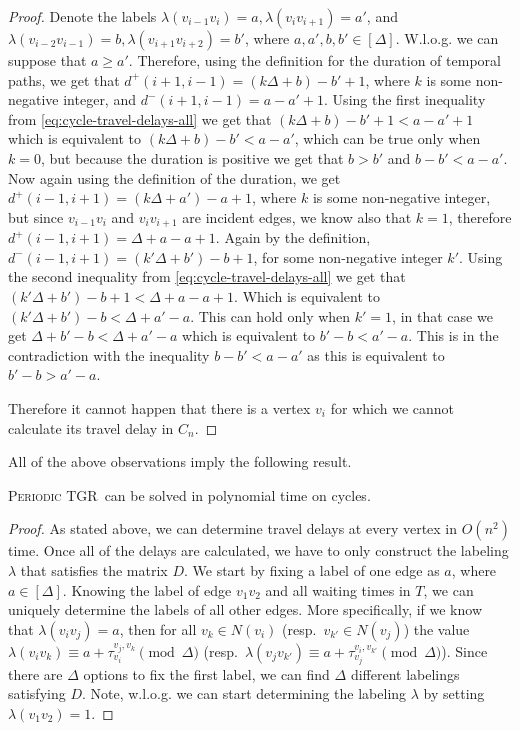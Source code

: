 \documentclass[a4paper,UKenglish,cleveref, autoref, thm-restate, anonymous]{lipics-v2021}
\newcommand{\deltaExact}{\textsc{Periodic TGR}}
\begin{document}
\begin{proof}
    Denote the labels $\lambda(v_{i-1}v_i) = a, \lambda(v_{i}v_{i+1})=a'$, and $\lambda(v_{i-2}v_{i-1}) = b, \lambda (v_{i+1}v_{i+2})=b'$, where $a,a',b,b' \in [\Delta]$.
    W.l.o.g. we can suppose that $a \geq a'$.
    Therefore, using the definition for the duration of temporal paths, we get that
    $d^+(i+1,i-1) = (k \Delta + b) - b' + 1$, where $k$ is some non-negative integer, and $d^-(i+1,i-1) = a - a' + 1$.
    Using the first inequality from \cref{eq:cycle-travel-delays-all} we get that 
    $(k \Delta + b) - b' +1 < a - a' + 1$ which is equivalent to $(k \Delta + b) - b' < a - a'$, which can be true only when $k = 0$, but because the duration is positive we get that $b > b'$ and
    $b - b' < a - a'$.
    Now again using the definition of the duration, we get
    $d^+(i-1,i+1)= (k\Delta + a') - a + 1$, where $k$ is some non-negative integer, but since $v_{i-1}v_i$ and $v_iv_{i+1}$ are incident edges, we know also that $k=1$, therefore $d^+(i-1,i+1)= \Delta + a - a + 1$. 
    Again by the definition, $d^-(i-1,i+1) = (k' \Delta + b') -b + 1$, for some non-negative integer $k'$.
    Using the second inequality from \cref{eq:cycle-travel-delays-all} we get that 
    $(k' \Delta + b') -b + 1 < \Delta + a - a + 1$.
    Which is equivalent to  $(k' \Delta + b') -b < \Delta + a' - a $. This can hold only when $k' = 1$, in that case we get $ \Delta + b' -b < \Delta + a' - a $ which is equivalent to $b' -b < a' - a$.
    This is in the contradiction with the inequality  $b - b' < a - a'$ as this is equivalent to $b'-b > a'-a$.
    
    Therefore it cannot happen that there is a vertex $v_i$ for which we cannot calculate its travel delay in $C_n$.
\end{proof}

All of the above observations imply the following result.
\begin{theorem}
    \deltaExact\ can be solved in polynomial time on cycles.
\end{theorem}

\begin{proof}
As stated above, we can determine travel delays at every vertex in $O(n^2)$ time. 
Once all of the delays are calculated, we have to only construct the labeling $\lambda$ that satisfies the matrix $D$. 
We start by fixing a label of one edge as $a$, where $a \in [\Delta]$.
Knowing the label of edge $v_1v_2$ and all waiting times in $T$, we can uniquely determine the labels of all other edges.
More specifically, if we know that $\lambda(v_i v_j) = a$, then for all $v_k \in N(v_i)$ (resp.~$v_{k'} \in N(v_j)$)
the value $\lambda(v_iv_k) \equiv a + \tau_{v_i}^{v_j,v_k} \pmod \Delta $ (resp.~$\lambda(v_j v_{k'}) \equiv a + \tau_{v_j}^{v_i,v_{k'}} \pmod \Delta $).
Since there are $\Delta$ options to fix the first label, we can find $\Delta$ different labelings satisfying $D$.
Note, w.l.o.g. we can start determining the labeling $\lambda$ by setting $\lambda(v_1v_2) = 1$.
\end{proof}
\end{document}
